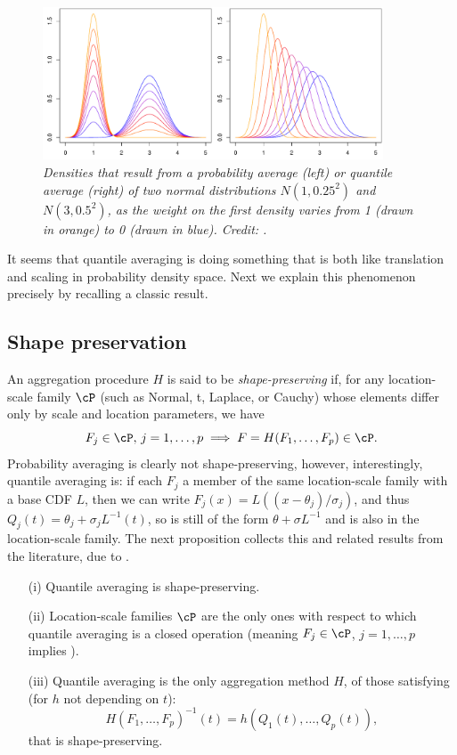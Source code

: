 \documentclass{article}
\begin{document}
\begin{figure}[htb]
\centering
\includegraphics[width=0.9\textwidth]{prob_quant.pdf} 
\caption{\it Densities that result from a probability average (left) or quantile
  average (right) of two normal distributions $N(1,0.25^2)$ and $N(3, 0.5^2)$,
  as the weight on the first density varies from 1 (drawn in orange) to 0
  (drawn in blue). Credit: \citet{fakoor2021flexible}.}  
\label{fig:prob_quant}
\end{figure}

It seems that quantile averaging is doing something that is both like
translation and scaling in probability density space. Next we explain this
phenomenon precisely by recalling a classic result.   

\subsection{Shape preservation}

An aggregation procedure $H$ is said to be \emph{shape-preserving} if, for any
location-scale family $\cP$ (such as Normal, t, Laplace, or Cauchy) whose
elements differ only by scale and location parameters, we have     
\[ 
F_j \in \cP, \, j=1,\dots,p \implies F = H(F_1,\dots,F_p) \in \cP.  
\]
Probability averaging is clearly not shape-preserving, however, interestingly,
quantile averaging is: if each $F_j$ a member of the same location-scale family
with a base CDF $L$, then we can write $F_j(x) = L((x-\theta_j)/\sigma_j)$, and  
thus $Q_j(t) = \theta_j + \sigma_j L^{-1}(t)$, so  is still of
the form $\theta + \sigma L^{-1}$ and  is also in the
location-scale family. The next proposition collects this and related results
from the literature, due to \citet{thomas1980appropriate,
  genest1992vincentization}.   

\begin{proposition}
\label{prop:shape_preservation} \hfill 
\begin{itemize}
\item[(i)] Quantile averaging is shape-preserving.        
\item[(ii)] Location-scale families $\cP$ are the only ones with respect to
  which quantile averaging is a closed operation (meaning $F_j \in \cP$,
  $j=1,\dots,p$ implies ).     
\item[(iii)] Quantile averaging is the only aggregation method $H$, of those 
  satisfying (for $h$ not depending on $t$):  
  \[
    H(F_1,\dots,F_p)^{-1}(t) = h(Q_1(t),\dots,Q_p(t)),
  \]
  that is shape-preserving.
\end{itemize}
\end{proposition}
\end{document}
